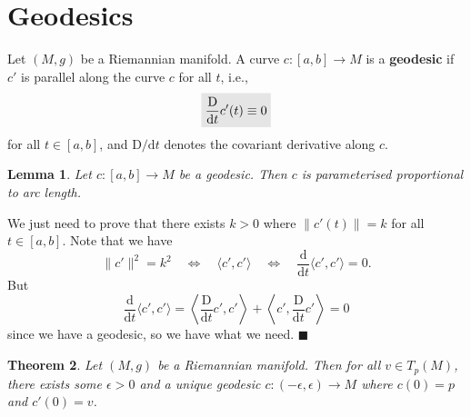 \documentclass[letter-paper]{tufte-book}
\newtheorem{theorem}{\color{pastel-blue}Theorem}[section]
\newtheorem{lemma}[theorem]{\color{pastel-blue}Lemma}
\newenvironment{proof}[1][Proof]{\begin{trivlist}
\item[\hskip \labelsep {\bfseries #1}]}{\end{trivlist}}
\newcommand{\qed}{\hfill$\blacksquare$}
\newcommand{\highlight}[1]{\mathchoice%
  {\colorbox{black!10}{$\displaystyle#1$}}%
  {\colorbox{black!10}{$\textstyle#1$}}%
  {\colorbox{black!10}{$\scriptstyle#1$}}%
  {\colorbox{black!10}{$\scriptscriptstyle#1$}}}%
\begin{document}

\section{Geodesics}

Let $(M,g)$ be a Riemannian manifold. A  curve $c:[a,b] \to M$ is a \textbf{geodesic} if $c'$ is parallel along the curve $c$ for all $t$, i.e.,
\begin{equation}
  \highlight{\frac{\mathrm{D}}{\mathrm{d}t} c'(t) \equiv 0}
\end{equation}
for all $t\in[a,b]$, and $\mathrm{D}/\mathrm{d}t$ denotes the covariant derivative along $c$.

\begin{lemma}
  Let $c:[a,b] \to M$ be a geodesic. Then $c$ is parameterised proportional to arc length.
\end{lemma}

\begin{proof}
  We just need to prove that there exists $k>0$ where $\|c'(t)\| = k$ for all $t \in [a,b]$. Note that we have
  \begin{equation*}
    \|c'\|^2 = k^2 \quad \Leftrightarrow \quad \langle c', c'\rangle \quad \Leftrightarrow \quad \frac{\mathrm{d}}{\mathrm{d}t} \langle c', c'\rangle = 0.
  \end{equation*}
  But
  \begin{equation*}
    \frac{\mathrm{d}}{\mathrm{d}t} \langle c', c'\rangle = \left\langle \frac{\mathrm{D}}{\mathrm{d}t}c', c'\right\rangle + \left\langle c', \frac{\mathrm{D}}{\mathrm{d}t}c'\right\rangle = 0
  \end{equation*}
  since we have a geodesic, so we have what we need. \qed
\end{proof}

\begin{theorem}
  Let $(M,g)$ be a Riemannian manifold. Then for all $v \in T_p(M)$, there exists some $\epsilon > 0$ and a unique geodesic $c:(-\epsilon, \epsilon) \to M$ where $c(0) = p$ and $c'(0) = v$.
\end{theorem}
\end{document}
